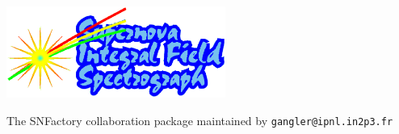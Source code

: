 %
%

\begin{center}
\hspace{-1.8cm}{\Huge \bf IFU/Ccd}
\vskip 0.5cm 
\hspace{-1.8cm}{\Large \bf Preprocessing package for SNIFS}
\vskip 0.5cm 
\vspace{1.0cm}

\hspace{-1.9cm}
\includegraphics[height=3cm,bb=55mm 103mm 160mm 177mm]{snifs.eps}

\vspace{1.5cm}

\hspace{-1.7cm} {\Large The SNFactory collaboration}
\vskip 0.5cm
\hspace{-1.7cm} {package maintained by \tt gangler@ipnl.in2p3.fr }
\vspace{2.0cm}
\end{center}

%

